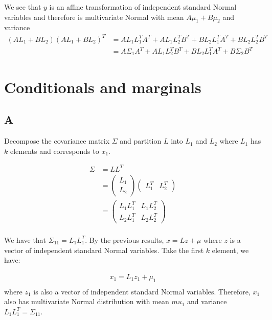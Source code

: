\documentclass{article}
\begin{document}
We see that \(y\) is an affine transformation of independent standard Normal variables and therefore is multivariate Normal with mean \(A\mu_1 + B\mu_2\) and variance
\begin{align*}
(AL_1 + BL_2)(AL_1 + BL_2)^T &= AL_1L_1^TA^T + AL_1L_2^TB^T + BL_2L_1^TA^T + BL_2L_2^TB^T\\
&= A \Sigma_1 A^T + AL_1L_2^TB^T + BL_2L_1^TA^T + B\Sigma_2B^T
\end{align*}
\section{Conditionals and marginals}
\subsection*{A}

Decompose the covariance matrix \(\Sigma\) and partition \(L\) into \(L_1\) and \(L_2\) where \(L_1\) has \(k\) elements and corresponds to \(x_1\).


\begin{align*}
\Sigma &= LL^T\\
&= \begin{pmatrix}
L_1\\
L_2
\end{pmatrix}\begin{pmatrix}
L_1^T & L_2^T
\end{pmatrix}\\
&= \begin{pmatrix}
L_1L_1^T & L_1L_2^T\\
L_2L_1^T & L_2L_2^T
\end{pmatrix}\\
\end{align*}

We have that \(\Sigma_{11} = L_1L_1^T\). By the previous results, \(x = Lz + \mu\) where \(z\) is a vector of independent standard Normal variables. Take the first \(k\) element, we have:

\begin{align*}
x_1 = L_1z_1 + \mu_1\\
\end{align*}
where \(z_1\) is also a vector of independent standard Normal variables. Therefore, \(x_1\) also has multivariate Normal distribution with mean \(mu_1\) and variance \(L_1L_1^T = \Sigma_{11}\).
\end{document}
